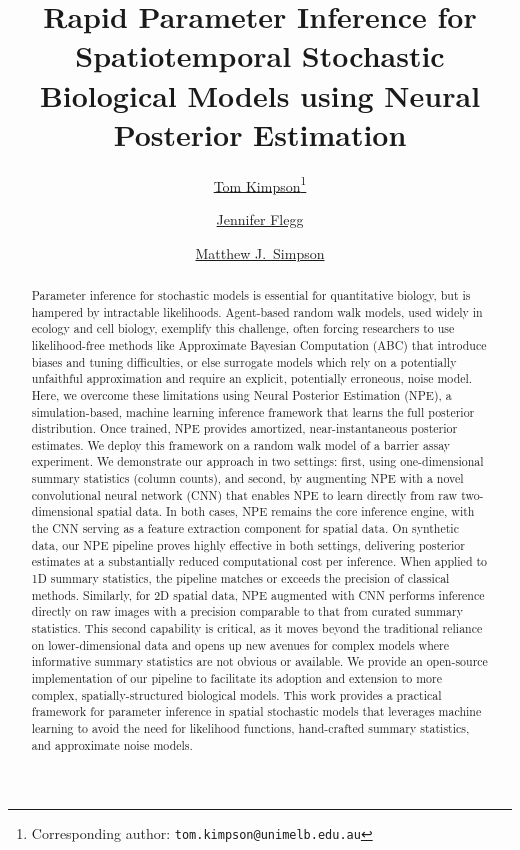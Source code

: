 \documentclass{article}
\title{Rapid Parameter Inference for Spatiotemporal Stochastic Biological Models using Neural Posterior Estimation}
\author[1]{%
	\href{https://orcid.org/0000-0002-6542-6032}{\usebox{\orcid}\hspace{1mm}Tom Kimpson\thanks{Corresponding author: \texttt{tom.kimpson@unimelb.edu.au}}}%
}
\author[1]{%
	\href{https://orcid.org/0000-0002-8809-726X}{\usebox{\orcid}\hspace{1mm}Jennifer Flegg}%
}
\author[2]{%
	\href{https://orcid.org/0000-0001-6254-313X}{\usebox{\orcid}\hspace{1mm}Matthew J.\ Simpson}%
}
\affil[1]{School of Mathematics and Statistics, The University of Melbourne, Parkville, VIC 3010, Australia}
\affil[2]{School of Mathematical Sciences, Queensland University of Technology, Brisbane, QLD 4001, Australia}
\begin{document}
\maketitle





\begin{abstract}
Parameter inference for stochastic models is essential for quantitative biology, but is hampered by intractable likelihoods. Agent-based random walk models, used widely in ecology and cell biology, exemplify this challenge, often forcing researchers to use likelihood-free methods like Approximate Bayesian Computation (ABC) that introduce biases and tuning difficulties, or else surrogate models which rely on a potentially unfaithful approximation and require an explicit, potentially erroneous, noise model. Here, we overcome these limitations using Neural Posterior Estimation (NPE), a simulation-based, machine learning inference framework that learns the full posterior distribution. Once trained, NPE provides amortized, near-instantaneous posterior estimates. We deploy this framework on a random walk model of a barrier assay experiment. We demonstrate our approach in two settings: first, using one-dimensional summary statistics (column counts), and second, by augmenting NPE with a novel convolutional neural network (CNN) that enables NPE to learn directly from raw two-dimensional spatial data. In both cases, NPE remains the core inference engine, with the CNN serving as a feature extraction component for spatial data. On synthetic data, our NPE pipeline proves highly effective in both settings, delivering posterior estimates at a substantially reduced computational cost per inference. When applied to 1D summary statistics, the pipeline matches or exceeds the precision of classical methods. Similarly, for 2D spatial data, NPE augmented with CNN performs inference directly on raw images with a precision comparable to that from curated summary statistics. This second capability is critical, as it moves beyond the traditional reliance on lower-dimensional data and opens up new avenues for complex models where informative summary statistics are not obvious or available. We provide an open-source implementation of our pipeline to facilitate its adoption and extension to more complex, spatially-structured biological models. This work provides a practical framework for parameter inference in spatial stochastic models that leverages machine learning to avoid the need for likelihood functions, hand-crafted summary statistics, and approximate noise models.
\end{abstract}
\end{document}
